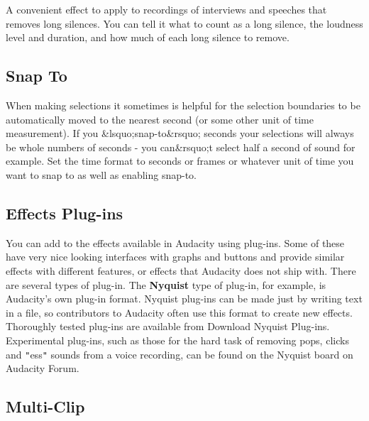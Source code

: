 \documentclass[twocolumn]{book}
\begin{document}
A convenient effect to apply to recordings of interviews and speeches that removes long silences.  You can tell it what to count as a long silence, the loudness level and duration, and how much of each long silence to remove.

\subsection{Snap To}


When making selections it sometimes is helpful for the selection boundaries to be automatically moved to the nearest second (or some other unit of time measurement).  If you \&lsquo;snap-to\&rsquo; seconds your selections will always be whole numbers of seconds - you can\&rsquo;t select half a second of sound for example.  Set the time format to seconds or frames or whatever unit of time you want to snap to as well as enabling snap-to.

\subsection{Effects Plug-ins}


You can add to the effects available in Audacity using plug-ins.  Some of these have very nice looking interfaces with graphs and buttons and provide similar effects with different features, or effects that Audacity does not ship with. There are several types of plug-in. The \textbf{Nyquist} type of plug-in, for example, is Audacity's own plug-in format. Nyquist plug-ins can be made just by writing text in a file, so contributors to Audacity often use this format to create new effects. Thoroughly tested plug-ins are available from Download Nyquist Plug-ins. Experimental plug-ins, such as those for the hard task of removing pops, clicks and \texttt{{}"{}}ess\texttt{{}"{}} sounds from a voice recording, can be found on the Nyquist board on Audacity Forum.

\subsection{Multi-Clip}
\end{document}
